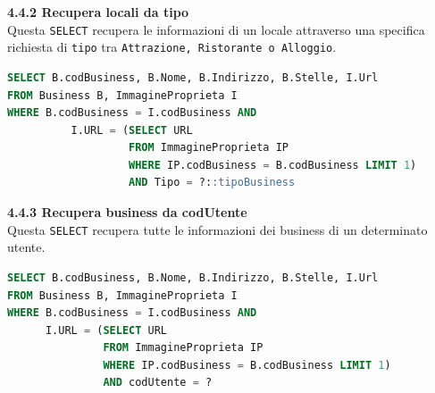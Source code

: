 \documentclass[a4paper,12pt]{article}
\begin{document}
\vspace*{+1cm}

{\flushleft \bf 4.4.2 Recupera locali da tipo}\\
Questa \verb|SELECT| recupera le informazioni di un locale attraverso una specifica richiesta di \verb|tipo| tra \verb|Attrazione, Ristorante o Alloggio|.
\begin{lstlisting}[language=SQL]
SELECT B.codBusiness, B.Nome, B.Indirizzo, B.Stelle, I.Url
FROM Business B, ImmagineProprieta I
WHERE B.codBusiness = I.codBusiness AND 
		  I.URL = (SELECT URL 
		           FROM ImmagineProprieta IP 
		           WHERE IP.codBusiness = B.codBusiness LIMIT 1) 
		           AND Tipo = ?::tipoBusiness
\end{lstlisting}

\vspace*{+1cm}

{\flushleft \bf 4.4.3 Recupera business da codUtente}\\
Questa \verb|SELECT| recupera tutte le informazioni dei business di un determinato utente.
\begin{lstlisting}[language=SQL]
SELECT B.codBusiness, B.Nome, B.Indirizzo, B.Stelle, I.Url
FROM Business B, ImmagineProprieta I
WHERE B.codBusiness = I.codBusiness AND 
	  I.URL = (SELECT URL 
			   FROM ImmagineProprieta IP 
			   WHERE IP.codBusiness = B.codBusiness LIMIT 1) 
			   AND codUtente = ?
\end{lstlisting}

\newpage
\end{document}
